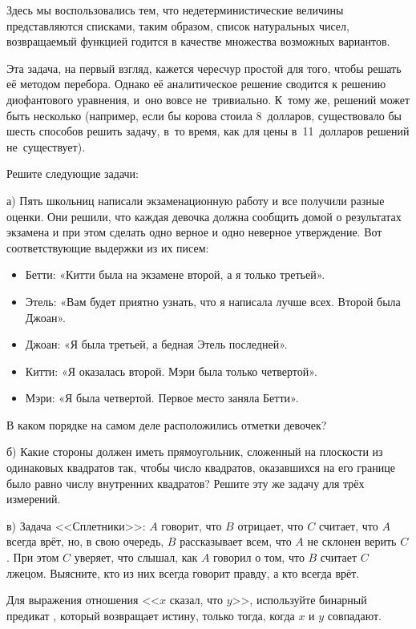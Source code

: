 Здесь мы воспользовались тем, что недетерминистические величины представляются списками, таким образом, список натуральных чисел, возвращаемый функцией  годится в качестве множества возможных вариантов.

Эта задача, на первый взгляд, кажется чересчур простой для того, чтобы решать её методом перебора. Однако её аналитическое решение сводится к решению диофантового уравнения, и~оно вовсе не~тривиально. К~тому же, решений может быть несколько (например, если бы корова стоила 8~долларов, существовало бы шесть способов решить задачу, в~то время, как для цены в~11~долларов решений не~существует).

\newpage
\begin{Assignment}
Решите следующие задачи:

\medskip
а) Пять школьниц написали экзаменационную работу и все получили разные оценки. Они решили, что каждая девочка должна сообщить домой о результатах экзамена и при этом сделать одно верное и
одно неверное утверждение. Вот соответствующие выдержки из их писем:
\begin{itemize}
  \item Бетти: «Китти была на экзамене второй, а я только третьей».
  \item Этель: «Вам будет приятно узнать, что я написала лучше всех. Второй была Джоан».
  \item Джоан: «Я была третьей, а бедная Этель последней».
  \item Китти: «Я оказалась второй. Мэри была только четвертой».
  \item Мэри: «Я была четвертой. Первое место заняла Бетти».
\end{itemize}
 В каком порядке на самом деле расположились отметки девочек?
 
 \medskip
 б)\label{as:rectangles} Какие стороны должен иметь прямоугольник, сложенный на плоскости из одинаковых квадратов так, чтобы число квадратов, оказавшихся на его границе было равно числу внутренних квадратов? Решите эту же задачу для трёх измерений.

  \medskip
 в) Задача <<Сплетники>>: $A$ говорит, что $B$ отрицает, что $C$ считает, что $A$ всегда врёт, но, в свою очередь, $B$ рассказывает всем, что $A$ не склонен верить $C$. При этом $C$ уверяет, что слышал, как $A$ говорил о том, что $B$ считает $C$ лжецом. Выясните, кто из них всегда говорит правду, а кто всегда врёт.
 
 Для выражения отношения <<$x$ сказал, что $y$>>, используйте бинарный предикат , который возвращает истину, только тогда, когда $x$ и $y$ совпадают.
\end{Assignment}


